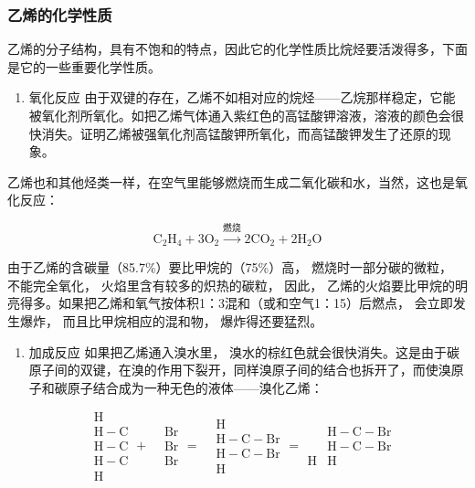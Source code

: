 \subsubsection{乙烯的化学性质}

乙烯的分子结构，具有不饱和的特点，因此它的化学性质比烷烃要活泼得多，下面是它的一些重要化学性质。

\begin{enumerate}
\item
  氧化反应
  由于双键的存在，乙烯不如相对应的烷烃------乙烷那样稳定，它能被氧化剂所氧化。如把乙烯气体通入紫红色的高锰酸钾溶液，溶液的颜色会很快消失。证明乙烯被强氧化剂高锰酸钾所氧化，而高锰酸钾发生了还原的现象。
\end{enumerate}

乙烯也和其他烃类一样，在空气里能够燃烧而生成二氧化碳和水，当然，这也是氧化反应：

\[
\mathrm{C}_{2}\mathrm{H}_{4}+3\mathrm{O}_{2}\xrightarrow{\text{燃烧}}2\mathrm{CO}_{2}+2\mathrm{H}_{2}\mathrm{O}
\]

由于乙烯的含碳量（85.7\%）要比甲烷的（75\%）高， 燃烧时一部分碳的微粒，
不能完全氧化， 火焰里含有较多的炽热的碳粒， 因此，
乙烯的火焰要比甲烷的明亮得多。如果把乙烯和氧气按体积1：3混和（或和空气1：15）后燃点，
会立即发生爆炸， 而且比甲烷相应的混和物， 爆炸得还要猛烈。

\begin{enumerate}[start=2]
\item
  加成反应 如果把乙烯通入溴水里，
  溴水的棕红色就会很快消失。这是由于碳原子间的双键，在溴的作用下裂开，同样溴原子间的结合也拆开了，而使溴原子和碳原子结合成为一种无色的液体------溴化乙烯：
\end{enumerate}

\[
\begin{array}{rl} & \mathrm{H} \\ & \mathrm{H} - \mathrm{C} \\ & \mathrm{H} - \mathrm{C} \\ & \mathrm{H} - \mathrm{C} \\ & \mathrm{H} \end{array} + \begin{array}{rl} & \mathrm{Br} \\ & \mathrm{Br} \\ & \mathrm{Br} \end{array} = \begin{array}{rl} & \mathrm{H} \\ & \mathrm{H} - \mathrm{C} - \mathrm{Br} \\ & \mathrm{H} - \mathrm{C} - \mathrm{Br} \\ & \mathrm{H} \end{array} = \begin{array}{rl} & \mathrm{H} - \mathrm{C} - \mathrm{Br} \\ & \mathrm{H} - \mathrm{C} - \mathrm{Br} \\ \mathrm{H} & \mathrm{H} \end{array}
\]


